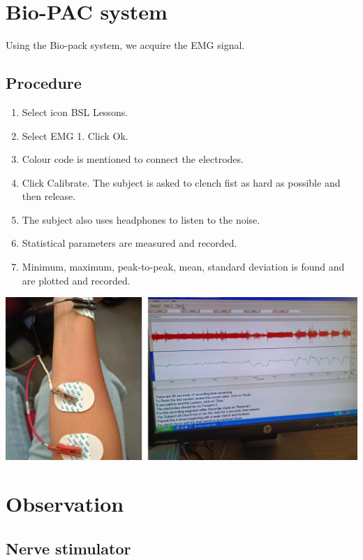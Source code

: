\documentclass[
  11pt,
  letterpaper,
  DIV=11,
  numbers=noendperiod]{scrreprt}
\providecommand{\tightlist}{%
  \setlength{\itemsep}{0pt}\setlength{\parskip}{0pt}}\usepackage{longtable,booktabs,array}
\begin{document}
\section{Bio-PAC system}\label{bio-pac-system-1}

Using the Bio-pack system, we acquire the EMG signal.

\subsection{Procedure}\label{procedure-3}

\begin{enumerate}
\def\labelenumi{\arabic{enumi}.}
\tightlist
\item
  Select icon BSL Lessons.
\item
  Select EMG 1. Click Ok.
\item
  Colour code is mentioned to connect the electrodes.
\item
  Click Calibrate. The subject is asked to clench fist as hard as
  possible and then release.
\item
  The subject also uses headphones to listen to the noise.
\item
  Statistical parameters are measured and recorded.
\item
  Minimum, maximum, peak-to-peak, mean, standard deviation is found and
  are plotted and recorded.
\end{enumerate}

\includegraphics[width=6.46875in,height=\textheight]{images/clipboard-1236183346.png}

\section{Observation}\label{observation-2}

\subsection{Nerve stimulator}\label{nerve-stimulator-1}
\end{document}
